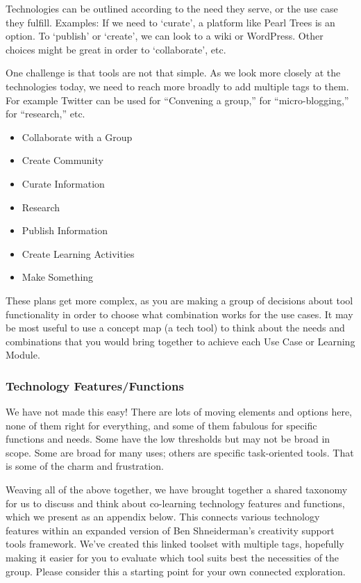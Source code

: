 Technologies can be outlined according to the need they serve, or the
use case they fulfill. Examples: If we need to `curate', a platform like
Pearl Trees is an option. To `publish' or `create', we can look to a
wiki or WordPress. Other choices might be great in order to
`collaborate', etc.

One challenge is that tools are not that simple. As we look more closely
at the technologies today, we need to reach more broadly to add multiple
tags to them. For example Twitter can be used for ``Convening a group,''
for ``micro-blogging,'' for ``research,'' etc.

\begin{itemize}
\tightlist
\item
  Collaborate with a Group
\item
  Create Community
\item
  Curate Information
\item
  Research
\item
  Publish Information
\item
  Create Learning Activities
\item
  Make Something
\end{itemize}

These plans get more complex, as you are making a group of decisions
about tool functionality in order to choose what combination works for
the use cases. It may be most useful to use a concept map (a tech tool)
to think about the needs and combinations that you would bring together
to achieve each Use Case or Learning Module.

\hypertarget{technology-featuresfunctions}{%
\subsubsection{Technology
Features/Functions}\label{technology-featuresfunctions}}

We have not made this easy! There are lots of moving elements and
options here, none of them right for everything, and some of them
fabulous for specific functions and needs. Some have the low thresholds
but may not be broad in scope. Some are broad for many uses; others are
specific task-oriented tools. That is some of the charm and frustration.

Weaving all of the above together, we have brought together a shared
taxonomy for us to discuss and think about co-learning technology
features and functions, which we present as an appendix below. This
connects various technology features within an expanded version of Ben
Shneiderman's creativity support tools framework. We've created this
linked toolset with multiple tags, hopefully making it easier for you to
evaluate which tool suits best the necessities of the group. Please
consider this a starting point for your own connected exploration.

